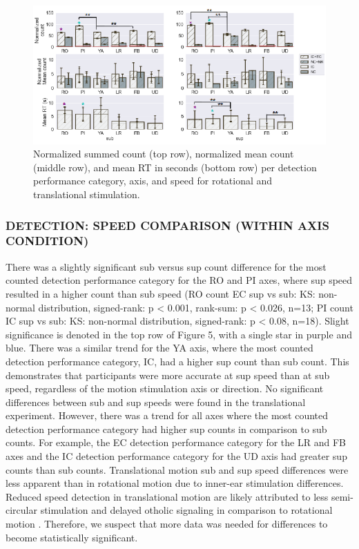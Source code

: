 \documentclass{ieeeaccess}
\begin{document}
\begin{figure}[htp]
\begin{center}
\includegraphics[width=1.0\linewidth]{figures/figure5.eps}
\end{center}
\caption{Normalized summed count (top row), normalized mean count (middle row), and mean RT in seconds (bottom row) per detection performance category, axis, and speed for rotational and translational stimulation.}
\label{fig5}
\end{figure}

\subsubsection{DETECTION: SPEED COMPARISON (WITHIN AXIS CONDITION)}
There was a slightly significant sub versus sup count difference for the most counted detection performance category for the RO and PI axes, where sup speed resulted in a higher count than sub speed (RO count EC sup vs sub: KS: non-normal distribution, signed-rank: p < 0.001, rank-sum: p < 0.026, n=13; PI count IC sup vs sub: KS: non-normal distribution, signed-rank: p < 0.08, n=18). Slight significance is denoted in the top row of Figure 5, with a single star in purple and blue. There was a similar trend for the YA axis, where the most counted detection performance category, IC, had a higher sup count than sub count. This demonstrates that participants were more accurate at sup speed than at sub speed, regardless of the motion stimulation axis or direction. No significant differences between sub and sup speeds were found in the translational experiment. However, there was a trend for all axes where the most counted detection performance category had higher sup counts in comparison to sub counts. For example, the EC detection performance category for the LR and FB axes and the IC detection performance category for the UD axis had greater sup counts than sub counts. Translational motion sub and sup speed differences were less apparent than in rotational motion due to inner-ear stimulation differences. Reduced speed detection in translational motion are likely attributed to less semi-circular stimulation and delayed otholic signaling in comparison to rotational motion \cite{Angelaki_2008_Vestibular}. Therefore, we suspect that more data was needed for differences to become statistically significant.
\end{document}
